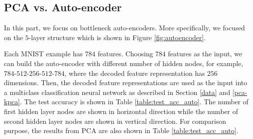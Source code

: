\documentclass[tikz, multi,dvipsnames,svgnames,x11names]{article}
\begin{document}
\subsection{PCA vs. Auto-encoder}
\label{pca-autoencoder}

In this part, we focus on bottleneck auto-encoders. More specifically, we focused on the $5$-layer structure which is shown in Figure \ref{fig:autoencoder}.

Each MNIST example has $784$ features. Choosing $784$ features as the input, we can build the auto-encoder with different number of hidden nodes, for example, $784$-$512$-$256$-$512$-$784$, where the decoded feature representation has $256$ dimensions. Then, the decoded feature representations are used as the input into a multiclass classification neural network as described in Section \ref{data} and \ref{pca-kpca}. The test accuracy is shown in Table \ref{table:test_acc_auto}. The number of first hidden layer nodes are shown in horizontal direction while the number of second hidden layer nodes are shown in vertical direction. For comparison purpose, the results from PCA are also shown in Table \ref{table:test_acc_auto}.

\end{document}
